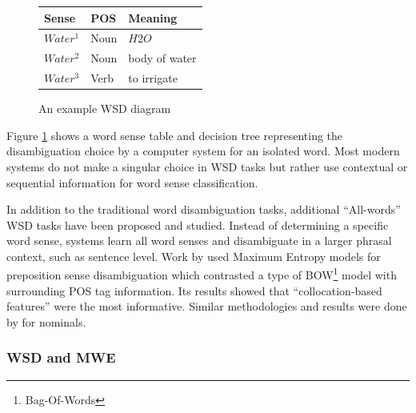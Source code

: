 \begin{figure}[!htbp]
\centering
\begin{framed}
\begin{minipage}{.5\textwidth}
\centering
  \begin{tabular}{ | l | l | l |}
    \hline
    Sense & POS & Meaning\\
    \hline
    $Water^1$ & Noun & $H2O$\\
    $Water^2$ & Noun & body of water\\
    $Water^3$ & Verb & to irrigate\\
    \hline
  \end{tabular}
\end{minipage}\hfill
\begin{minipage}{.5\textwidth}
 \centering
\end{minipage}
\end{framed}
\caption{An example WSD diagram}
\label{fig:decisionwsd}
\end{figure}

Figure \ref{fig:decisionwsd} shows a word sense table and decision tree representing the disambiguation choice by a computer system for an isolated word. Most modern systems do not make a singular choice in WSD tasks but rather use contextual or sequential information for word sense classification.

In addition to the traditional word disambiguation tasks, additional ``All-words'' WSD tasks have been proposed and studied. Instead of determining a specific word sense, systems learn all word senses and disambiguate in a larger phrasal context, such as sentence level\cite{Stetina1998}. Work by \cite{Ye2007} used Maximum Entropy models for preposition sense disambiguation which contrasted a type of BOW\footnote{Bag-Of-Words} model with surrounding POS tag information. Its results showed that ``collocation-based features'' were the most informative. Similar methodologies and results were done by \cite{Tratz2010} for nominals. 

\subsubsection{WSD and MWE}

